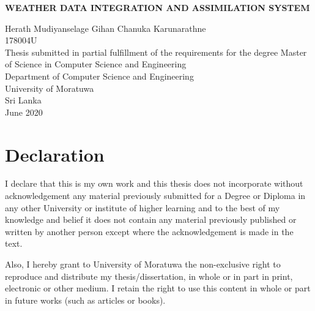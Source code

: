 \documentclass[a4paper,oneside,12pt]{report}
\begin{document}
\begin{titlepage}
    \begin{center}
        \Large{
        \textbf{WEATHER DATA INTEGRATION AND ASSIMILATION SYSTEM}}\\
        \vspace{144pt}
  \large      

        Herath Mudiyanselage Gihan Chanuka Karunarathne\\
        \vspace{24pt}
        178004U\\
         \vspace{72pt}
        \normalsize
        Thesis submitted in partial fulfillment of the requirements for the degree Master of Science in Computer Science and Engineering\\
     
       \vspace{72pt}
        \large
        Department of Computer Science and Engineering\\
        \vspace{24pt}
        University of Moratuwa\\
        Sri Lanka\\
        \vspace{32pt}
        June 2020
        
    \end{center}
\end{titlepage}


\chapter*{Declaration}

I declare that this is my own work and this thesis does not
incorporate without acknowledgement any material previously submitted for a
Degree or Diploma in any other University or institute of higher learning and to
the best of my knowledge and belief it does not contain any material previously
published or written by another person except where the acknowledgement is
made in the text.

Also, I hereby grant to University of Moratuwa the non-exclusive right to
reproduce and distribute my thesis/dissertation, in whole or in part in print,
electronic or other medium. I retain the right to use this content in whole or part
in future works (such as articles or books).
\end{document}
